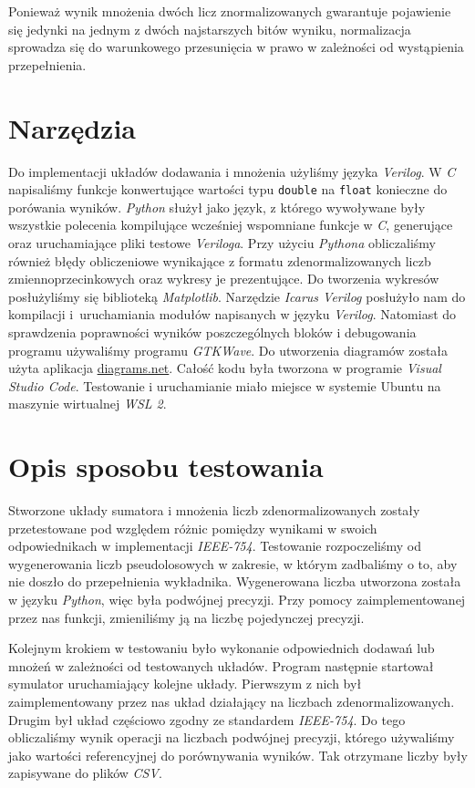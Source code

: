 \documentclass{article}
\begin{document}
Ponieważ wynik mnożenia dwóch licz znormalizowanych gwarantuje pojawienie się jedynki na jednym z dwóch najstarszych bitów wyniku, normalizacja sprowadza się do warunkowego przesunięcia w prawo w zależności od wystąpienia przepełnienia.


\section{Narzędzia}
Do implementacji układów dodawania i mnożenia użyliśmy języka \emph{Verilog}.
W \emph{C} napisaliśmy funkcje konwertujące wartości typu \texttt{double} na \texttt{float} konieczne do porówania wyników.
\emph{Python} służył jako język, z którego wywoływane były wszystkie polecenia kompilujące wcześniej wspomniane funkcje w \emph{C}, generujące oraz uruchamiające pliki testowe \emph{Veriloga}.
Przy użyciu \emph{Pythona} obliczaliśmy również błędy obliczeniowe wynikające z formatu zdenormalizowanych liczb zmiennoprzecinkowych oraz wykresy je prezentujące.
Do tworzenia wykresów posłużyliśmy się biblioteką \emph{Matplotlib}.
Narzędzie \emph{Icarus Verilog} posłużyło nam do kompilacji i~uruchamiania modułów napisanych w języku \emph{Verilog}.
Natomiast do sprawdzenia poprawności wyników poszczególnych bloków i debugowania programu używaliśmy programu \emph{GTKWave}.
Do utworzenia diagramów została użyta aplikacja \url{diagrams.net}.
Całość kodu była tworzona w programie \emph{Visual Studio Code}.
Testowanie i uruchamianie miało miejsce w systemie Ubuntu na maszynie wirtualnej \emph{WSL 2}.


\section{Opis sposobu testowania}
Stworzone układy sumatora i mnożenia liczb zdenormalizowanych zostały przetestowane pod względem różnic pomiędzy wynikami w swoich odpowiednikach w implementacji \emph{IEEE-754}.
Testowanie rozpoczeliśmy od wygenerowania liczb pseudolosowych w zakresie, w którym zadbaliśmy o to, aby nie doszło do przepełnienia wykładnika.
Wygenerowana liczba utworzona została w języku \emph{Python}, więc była podwójnej precyzji.
Przy pomocy zaimplementowanej przez nas funkcji, zmieniliśmy ją na liczbę pojedynczej precyzji.

Kolejnym krokiem w testowaniu było wykonanie odpowiednich dodawań lub mnożeń w zależności od testowanych układów.
Program następnie startował symulator uruchamiający kolejne układy.
Pierwszym z nich był zaimplementowany przez nas układ działający na liczbach zdenormalizowanych.
Drugim był układ częściowo zgodny ze standardem \emph{IEEE-754}.
Do tego obliczaliśmy wynik operacji na liczbach podwójnej precyzji, którego używaliśmy jako wartości referencyjnej do porównywania wyników.
Tak otrzymane liczby były zapisywane do plików \emph{CSV}.
\end{document}
